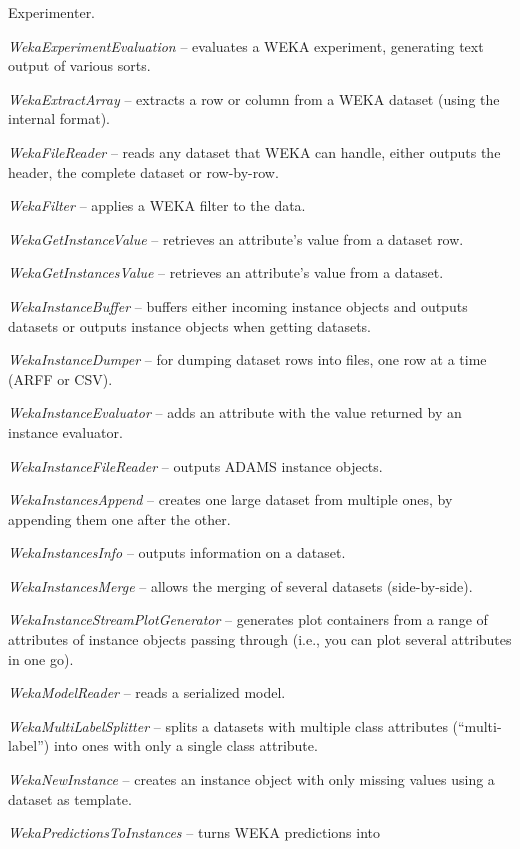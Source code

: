 \begin{tight_itemize}
	Experimenter.
	\item \textit{WekaExperimentEvaluation} -- evaluates a WEKA experiment,
	generating text output of various sorts.
	\item \textit{WekaExtractArray} -- extracts a row or column from a WEKA
	dataset (using the internal format).
	\item \textit{WekaFileReader} -- reads any dataset that WEKA can handle, 
	either outputs the header, the complete dataset or row-by-row.
	\item \textit{WekaFilter} -- applies a WEKA filter to the data.
	\item \textit{WekaGetInstanceValue} -- retrieves an attribute's value from
	a dataset row.
	\item \textit{WekaGetInstancesValue} -- retrieves an attribute's value from
	a dataset.
	\item \textit{WekaInstanceBuffer} -- buffers either incoming instance 
	objects and outputs datasets or outputs instance objects when getting
	datasets.
	\item \textit{WekaInstanceDumper} -- for dumping dataset rows into files,
	one row at a time (ARFF or CSV).
	\item \textit{WekaInstanceEvaluator} -- adds an attribute with the value
	returned by an instance evaluator.
	\item \textit{WekaInstanceFileReader} -- outputs ADAMS instance objects.
	\item \textit{WekaInstancesAppend} -- creates one large dataset from 
	multiple ones, by appending them one after the other.
	\item \textit{WekaInstancesInfo} -- outputs information on a dataset.
	\item \textit{WekaInstancesMerge} -- allows the merging of several datasets 
	(side-by-side).
	\item \textit{WekaInstanceStreamPlotGenerator} -- generates plot containers
	from a range of attributes of instance objects passing through (i.e., you 
	can plot several attributes in one go).
	\item \textit{WekaModelReader} -- reads a serialized model.
	\item \textit{WekaMultiLabelSplitter} -- splits a datasets with multiple
	class attributes (``multi-label'') into ones with only a single class 
	attribute.
	\item \textit{WekaNewInstance} -- creates an instance object with only 
	missing values using a dataset as template.
	\item \textit{WekaPredictionsToInstances} -- turns WEKA predictions into

\end{tight_itemize}
